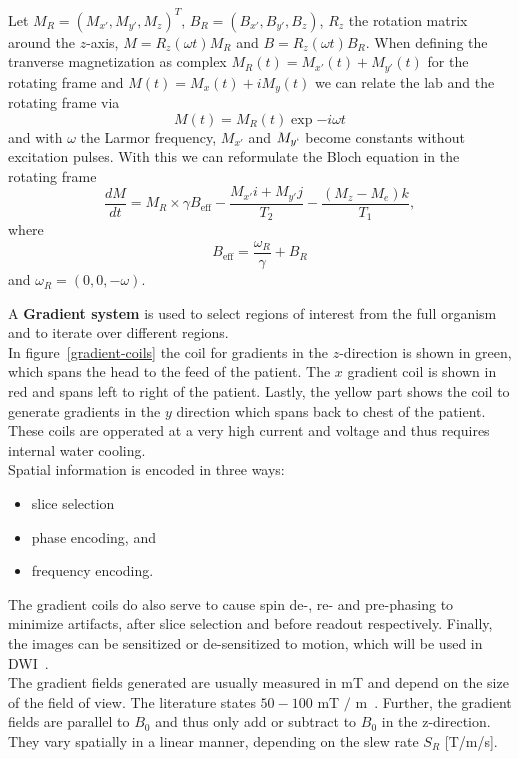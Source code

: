 Let $M_{R} = \left( M_{x'}, M_{y'}, M_z \right)^T$, $B_R = \left( B_{x'}, B_{y'}, B_z \right)$, $R_z$ the rotation matrix around the $z$-axis, $M = R_z(\omega t) M_R$ and $B = R_z(\omega t) B_R$.
When defining the tranverse magnetization as complex $M_R(t) = M_{x'}(t) + M_{y'}(t)$ for the rotating frame and $M(t) = M_x(t) + i M_y(t)$ we can relate the lab and the rotating frame via
\[ M(t) = M_R(t) \exp{-i \omega t} \]
and with $\omega$ the Larmor frequency, $M_{x'}$ and $M_{y`}$ become constants without excitation pulses.
With this we can reformulate the Bloch equation in the rotating frame
\[ \frac{dM}{dt} = M_R \times \gamma B_{\text{eff}} - \frac{M_{x'} i + M_{y'} j}{T_2} - \frac{(M_z - M_e) k }{T_1}, \]
where \[ B_{\text{eff}} = \frac{\omega_R}{\gamma} + B_R \] and $\omega_R = \left( 0, 0, - \omega \right)$.


A \textbf{Gradient system} is used to select regions of interest from the full organism and to iterate over different regions. \\
In figure~\ref{gradient-coils} the coil for gradients in the $z$-direction is shown in green, which spans the head to the feed of the patient.
The $x$ gradient coil is shown in red and spans left to right of the patient.
Lastly, the yellow part shows the coil to generate gradients in the $y$ direction which spans back to chest of the patient.
These coils are opperated at a very high current and voltage and thus requires internal water cooling. \\

Spatial information is encoded in three ways:
\begin{itemize}
 \item slice selection
 \item phase encoding, and
 \item frequency encoding.
\end{itemize}
The gradient coils do also serve to cause spin de-, re- and pre-phasing to minimize artifacts, after slice selection and before readout respectively.
Finally, the images can be sensitized or de-sensitized to motion, which will be used in DWI~\autocite{bernstein_handbook_2004}. \\

The gradient fields generated are usually measured in mT and depend on the size of the field of view.
The literature states $50-100$ mT $/$ m~\autocite{bernstein_handbook_2004}.
Further, the gradient fields are parallel to $B_0$ and thus only add or subtract to $B_0$ in the z-direction.
They vary spatially in a linear manner, depending on the slew rate $S_R$ [T/m/s].

